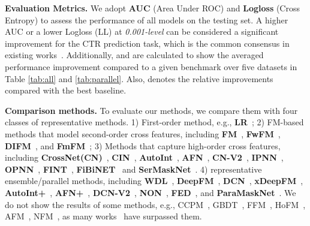 \documentclass[sigconf]{acmart}
\begin{document}
\textbf{Evaluation Metrics.}
We adopt \textbf{AUC} (Area Under ROC) and \textbf{Logloss} (Cross Entropy) to assess the performance of all models on the testing set. A higher AUC or a lower Logloss (LL) at \textit{0.001-level} can be considered a significant improvement for the CTR prediction task, which is the common consensus in existing works~\cite{wang2022enhancing, zhu2022nasctr, wang2021dcnm, huang2019fibinet, lian2018xdeepfm}. Additionally,  and  are calculated to show the averaged performance improvement compared to a given benchmark over five datasets in Table \ref{tab:all} and \ref{tab:parallel}. Also,  denotes the relative improvements compared with the best baseline. 


\textbf{Comparison methods.}
To evaluate our methods, we compare them with four classes of representative methods. 
1) First-order method, e.g., \textbf{LR}~\cite{richardson2007predicting};
2) FM-based methods that model second-order cross features, including \textbf{FM}~\cite{rendle2012factorization}, 
\textbf{FwFM}~\cite{pan2018field}, 
\textbf{DIFM}~\cite{lu2020dual}, and
\textbf{FmFM}~\cite{sun2021fm2};
3) Methods that capture high-order cross features, including 
\textbf{CrossNet(CN)}~\cite{wang2017deep}, 
\textbf{CIN}~\cite{lian2018xdeepfm},
\textbf{AutoInt}~\cite{song2019autoint}, 
\textbf{AFN}~\cite{cheng2020adaptive}, 
\textbf{CN-V2}~\cite{wang2021dcnm},
\textbf{IPNN}~\cite{qu2018product}, 
\textbf{OPNN}~\cite{qu2018product},
\textbf{FINT}~\cite{zhao2021fint}, 
\textbf{FiBiNET}~\cite{huang2019fibinet} and 
\textbf{SerMaskNet}~\cite{wang2021masknet}.  
4) representative ensemble/parallel methods, including 
\textbf{WDL}~\cite{cheng2016wide}, 
\textbf{DeepFM}~\cite{guo2017deepfm}, 
\textbf{DCN}~\cite{wang2017deep}, 
\textbf{xDeepFM}~\cite{lian2018xdeepfm}, 
\textbf{AutoInt+}~\cite{song2019autoint}, 
\textbf{AFN+}~\cite{cheng2020adaptive}, 
\textbf{DCN-V2}~\cite{wang2021dcnm},
\textbf{NON}~\cite{luo2020network},
\textbf{FED}~\cite{zhao2020fed}, 
and \textbf{ParaMaskNet}~\cite{wang2021masknet}. 
We do not show the results of some methods, e.g., CCPM~\cite{gehring2017convolutional}, GBDT~\cite{chen2016xgboost}, FFM~\cite{juan2016field}, HoFM~\cite{blondel2016higher}, AFM~\cite{xiao2017attentional}, NFM~\cite{he2017neural}, as many works~\cite{cheng2020adaptive, wang2021dcnm, wang2021masknet} have surpassed them.
\end{document}
